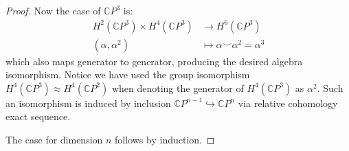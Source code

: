 \documentclass{article}
\numberwithin{equation}{section}
\newcommand{\C}{\mathbb{C}}
\begin{document}
\begin{proof}
	Now the case of $\C P^3$ is:
	\begin{align*}
		H^2(\C P^3)\times H^4(\C P^3)&\to H^6(\C P^3)\\
		(\alpha,\alpha^2)\qquad\quad&\mapsto\alpha\smile\alpha^2=\alpha^3
	\end{align*}
	which also  maps generator to generator, producing the desired algebra isomorphism. Notice we have used the group isomorphism $H^4(\C P^3)\approx H^4(\C P^2)$ when denoting the generator of $H^4(\C P^3)$ as $\alpha^2$. Such an isomorphism is induced by inclusion $\C P^{n-1}\hookrightarrow\C P^n$ via relative cohomology exact sequence.
	
	The case for dimension $n$ follows by induction.
\end{proof}

\printbibliography
\clearpage
\end{document}

